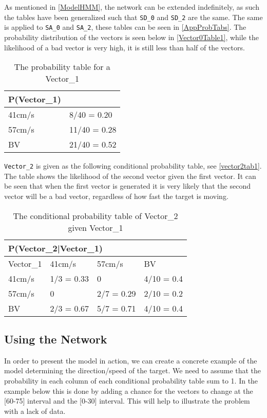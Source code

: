 As mentioned in \autoref{ModelHMM}, the network can be extended indefinitely,
as such the tables have been generalized such that \texttt{SD\_0} and
\texttt{SD\_2} are the same. The same is applied to \texttt{SA\_0} and
\texttt{SA\_2}, these tables can be seen in \autoref{AppProbTabs}. The probability
distribution of the vectors is seen below in \autoref{Vector0Table1}, while the
likelihood of a bad vector is very high, it is still less than half of the
vectors.

\begin{table}[H]
\centering
\begin{tabular}{|l|l|}
\hline
P(Vector\_1) &\\ \hline
41cm/s & 8/40 = 0.20   \\ \hline 
57cm/s & 11/40 = 0.28  \\ \hline
BV & 21/40 = 0.52  \\ \hline
\end{tabular}
\caption{The probability table for a Vector\_1}
\label{Vector0Table1}
\end{table}


\texttt{Vector\_2} is given as the following conditional probability table, see
\autoref{vector2tab1}. The table shows the likelihood of the second vector given
the first vector. It can be seen that when the first vector is generated it is
very likely that the second vector will be a bad vector, regardless of how fast
the target is moving.

\begin{table}[H]
\centering
\begin{tabular}{|l|l|l|l|}
\hline
\multicolumn{4}{|l|}{P(Vector\_2|Vector\_1)} \\ \hline
 Vector\_1 & 41cm/s    & 57cm/s    & BV    \\ \hline
 41cm/s    & 1/3 = 0.33 & 0     & 4/10 = 0.4    \\ \hline
 57cm/s    & 0          & 2/7 = 0.29 & 2/10 = 0.2  \\ \hline
 BV        & 2/3 = 0.67 & 5/7 = 0.71 & 4/10 = 0.4  \\ \hline
\end{tabular}
\caption{The conditional probability table of Vector\_2 given Vector\_1}
\label{vector2tab1}
\end{table}


\subsection{Using the Network}
In order to present the model in action, we can create a concrete example of the
model determining the direction/speed of the target. We need to assume that the
probability in each column of each conditional probability table sum to 1. In
the example below this is done by adding a chance for the vectors to change at
the [60-75] interval and the [0-30] interval. This will help to illustrate the
problem with a lack of data.\nl

